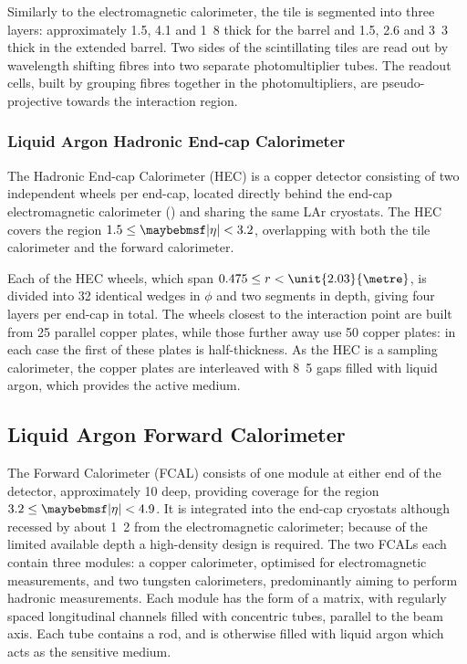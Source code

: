 Similarly to the electromagnetic calorimeter, the tile is segmented into three layers:
approximately 1.5, 4.1 and \unit{1.8}{\lambda} thick for the barrel and 1.5,
2.6 and \unit{3.3}{\lambda} thick in the extended barrel. Two sides of the
scintillating tiles are read out by wavelength shifting fibres into two separate
photomultiplier tubes. The readout cells, built by grouping fibres together in the
photomultipliers, are pseudo-projective towards the interaction region.

\subsubsection{Liquid Argon Hadronic End-cap Calorimeter}
The Hadronic End-cap Calorimeter (HEC) is a copper detector consisting of two
independent wheels per end-cap, located directly behind the end-cap
electromagnetic calorimeter ()
and sharing the same LAr cryostats. The HEC covers the region $1.5 \leq \absEta < 3.2$,
overlapping with both the tile calorimeter and the forward calorimeter.

Each of the HEC wheels, which span $0.475 \leq r < \unit{2.03}{\metre}$,
is divided into 32 identical wedges in $\phi$ and two segments in depth, giving
four layers per end-cap in total. The wheels closest to the interaction point
are built from \unit{25}{\milli\metre} parallel copper plates, while those
further away use \unit{50}{\milli\metre} copper plates: in each case the first
of these plates is half-thickness. As the HEC is a sampling calorimeter, the copper plates
are interleaved with \unit{8.5}{\milli\metre} gaps filled with liquid argon,
which provides the active medium.

\subsection{Liquid Argon Forward Calorimeter}
The Forward Calorimeter (FCAL) consists of one module at either end of the
detector, approximately \unit{10}{\lambda} deep, providing coverage for the
region $3.2 \leq \absEta < 4.9$. It is integrated into the end-cap cryostats
although recessed by about \unit{1.2}{\metre} from the electromagnetic calorimeter;
because of the limited available depth a high-density design is required. The two
FCALs each contain three modules: a copper calorimeter, optimised for electromagnetic
measurements, and two tungsten calorimeters, predominantly aiming to perform
hadronic measurements. Each module has the form of a matrix, with regularly
spaced longitudinal channels filled with concentric tubes, parallel to the beam
axis. Each tube contains a rod, and is otherwise filled with liquid argon which
acts as the sensitive medium.

